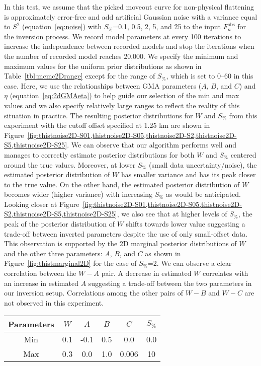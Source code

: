 In this test, we assume that the picked moveout curve for non-physical flattening is approximately error-free and add artificial Gaussian noise with a variance equal to $S^2$ (equation~\ref{eq:noise}) with $S_{\%}$=0.1, 0.5, 2, 5, and 25 to the input $F^{\text{obs}}_n$ for the inversion process. We record model parameters at every 100 iterations to increase the independence between recorded models and stop the iterations when the number of recorded model reaches 20,000. We specify the minimum and maximum values for the uniform prior distributions as shown in Table~\ref{tbl:mcmc2Drange} except for the range of $S_{\%}$, which is set to 0--60 in this case. Here, we use the relationships between GMA parameters ($A$, $B$, and $C$) and $\eta$ (equation~\ref{eq:2dGMAeta}) to help guide our selection of the min and max values and we also specify relatively large ranges to reflect the reality of this situation in practice. The resulting posterior distributions for $W$ and $S_{\%}$ from this experiment with the cutoff offset specified at 1.25 km are shown in Figure~\ref{fig:thistnoise2D-S01,thistnoise2D-S05,thistnoise2D-S2,thistnoise2D-S5,thistnoise2D-S25}. We can observe that our algorithm performs well and manages to correctly estimate posterior distributions for both $W$ and $S_{\%}$ centered around the true values. Moreover, at lower $S_{\%}$ (small data uncertainty/noise), the estimated posterior distribution of $W$ has smaller variance and has its peak closer to the true value. On the other hand, the estimated posterior distribution of $W$ becomes wider (higher variance) with increasing $S_{\%}$ as would be anticipated. Looking closer at Figure~\ref{fig:thistnoise2D-S01,thistnoise2D-S05,thistnoise2D-S2,thistnoise2D-S5,thistnoise2D-S25}, we also see that at higher levels of $S_{\%}$, the peak of the posterior distribution of $W$ shifts towards lower value suggesting a trade-off between inverted parameters despite the use of only small-offset data. This observation is supported by the 2D marginal posterior distributions of $W$ and the other three parameters: $A$, $B$, and $C$ as shown in Figure~\ref{fig:thistmarginal2D} for the case of $S_{\%}$=2. We can observe a clear correlation between the $W-A$ pair. A decrease in estimated $W$ correlates with an increase in estimated $A$ suggesting a trade-off between the two parameters in our inversion setup. Correlations among the other pairs of $W-B$ and $W-C$ are not observed in this experiment.

{
\centering
    {
     \begin{tabular}{|c|c|c|c|c|c|}
     	     \hline  Parameters &  $W$ & $A$ & $B$ & $C$ & $S_{\%}$  \\ 
     	     \hline Min & 0.1 & -0.1 & 0.5 & 0.0 & 0.0 \\
     	     \hline Max & 0.3 & 0.0 & 1.0 & 0.006 & 10  \\
     	     \hline
    \end{tabular}
    }
}

